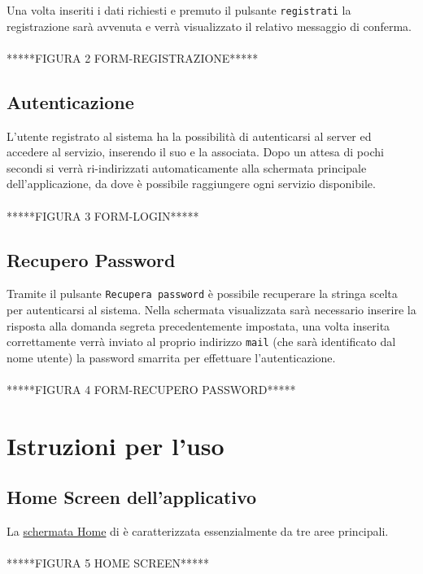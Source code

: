 Una volta inseriti i dati richiesti e premuto il pulsante \texttt{registrati} la registrazione sarà avvenuta e verrà visualizzato il relativo messaggio di conferma.
\\\\*****FIGURA 2 FORM-REGISTRAZIONE*****

\subsection{Autenticazione}
L'utente registrato al sistema ha la possibilità di autenticarsi al server \caName{} ed accedere al servizio, inserendo il suo  e la  associata.
Dopo un attesa di pochi secondi si verrà ri-indirizzati automaticamente alla schermata principale dell'applicazione, da dove è possibile raggiungere ogni servizio disponibile.
\\\\*****FIGURA 3 FORM-LOGIN*****

\subsection{Recupero Password}
Tramite il pulsante \texttt{Recupera password} è possibile recuperare la stringa scelta per autenticarsi al sistema. Nella schermata visualizzata sarà necessario inserire la risposta alla domanda segreta precedentemente impostata, una volta inserita correttamente verrà inviato al proprio indirizzo \texttt{mail} (che sarà identificato dal nome utente) la password smarrita per effettuare l'autenticazione.
\\\\*****FIGURA 4 FORM-RECUPERO PASSWORD*****

\section{Istruzioni per l'uso}
\subsection{Home Screen dell'applicativo }
La \underline{schermata Home} di \caName{} è caratterizzata essenzialmente da tre aree principali.
\\\\*****FIGURA 5 HOME SCREEN*****

